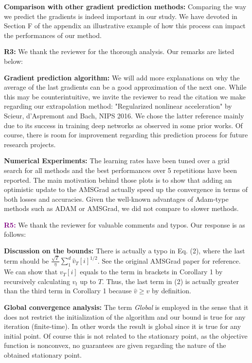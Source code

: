 \documentclass{article}
\begin{document}
\textbf{Comparison with other gradient prediction methods:} Comparing the way we predict the gradients is indeed important in our study. We have devoted in Section F of the appendix an illustrative example of how this process can impact the performances of our method. 

\vspace{0.01in}
\textbf{\textcolor{green!50!black}{R3:}} We thank the reviewer for the thorough analysis. Our remarks are listed below:\vspace{-5pt}

\textbf{Gradient prediction algorithm:} We will add more explanations on why the average of the last gradients can be a good approximation of the next one. While this may be counterintuitive, we invite the reviewer to read the citation we make regarding our extrapolation method: "Regularized nonlinear acceleration" by Scieur, d'Aspremont and Bach, NIPS 2016.
We chose the latter reference mainly due to its success in training deep networks as observed in some prior works.
Of course, there is room for improvement regarding this prediction process for future research projects.\vspace{-5pt}

\textbf{Numerical Experiments:} The learning rates have been tuned over a grid search for all methods and the best performances over 5 repetitions have been reported.
The main motivation behind those plots is to show that adding an optimistic update to the AMSGrad actually speed up the convergence in terms of both losses and accuracies.
Given the well-known advantages of Adam-type methods such as ADAM or AMSGrad, we did not compare to slower methods.

\vspace{0.01in}

\textbf{\textcolor{purple}{R5:}} We thank the reviewer for valuable comments and typos. Our response is as follows:\vspace{-5pt}

\textbf{Discussion on the bounds:} There is actually a typo in Eq. (2), where the last term should be $\frac{\sqrt T}{\eta}\sum_1^d \hat v_T[i]^{1/2}$. See the original AMSGrad paper for reference. We can show that $v_T[i]$ equals to the term in brackets in Corollary 1 by recursively calculating $v_t$ up to $T$. Thus, the last term in (2) is actually greater than the third term in Corollary 1 because $\hat v\geq v$ by definition.\vspace{-5pt}

\textbf{Global convergence analysis:} The term \emph{Global} is employed in the sense that it does not restrict the initialization of the algorithm and our bound is true for any iteration (finite-time). In other words the result is global since it is true for any initial point. Of course this is not related to the stationary point, as the objective function is nonconvex, no guarantees are given regarding the nature of the obtained stationary point.\vspace{-5pt}
\end{document}
